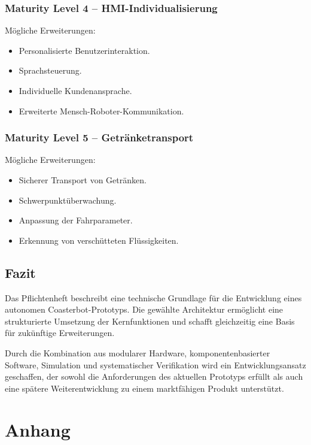 \subsubsection{Maturity Level 4 --
HMI-Individualisierung}\label{maturity-level-4-hmi-individualisierung}

Mögliche Erweiterungen:

\begin{itemize}
\tightlist
\item
  Personalisierte Benutzerinteraktion.
\item
  Sprachsteuerung.
\item
  Individuelle Kundenansprache.
\item
  Erweiterte Mensch-Roboter-Kommunikation.
\end{itemize}

\subsubsection{Maturity Level 5 --
Getränketransport}\label{maturity-level-5-getruxe4nketransport}

Mögliche Erweiterungen:

\begin{itemize}
\tightlist
\item
  Sicherer Transport von Getränken.
\item
  Schwerpunktüberwachung.
\item
  Anpassung der Fahrparameter.
\item
  Erkennung von verschütteten Flüssigkeiten.
\end{itemize}

\subsection{Fazit}\label{fazit}

Das Pflichtenheft beschreibt eine technische Grundlage für die
Entwicklung eines autonomen Coasterbot-Prototyps. Die gewählte
Architektur ermöglicht eine strukturierte Umsetzung der Kernfunktionen
und schafft gleichzeitig eine Basis für zukünftige Erweiterungen.

Durch die Kombination aus modularer Hardware, komponentenbasierter
Software, Simulation und systematischer Verifikation wird ein
Entwicklungsansatz geschaffen, der sowohl die Anforderungen des
aktuellen Prototyps erfüllt als auch eine spätere Weiterentwicklung zu
einem marktfähigen Produkt unterstützt.

\section{Anhang}\label{anhang}

